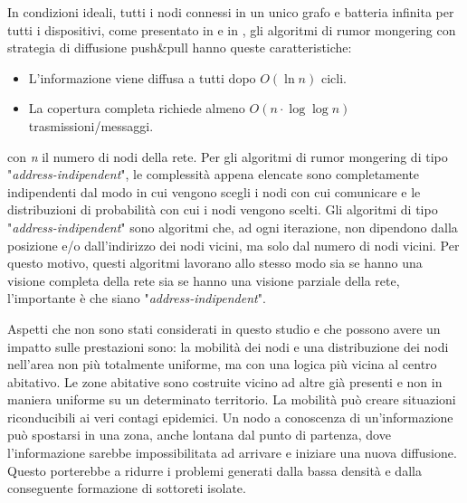 In condizioni ideali, tutti i nodi connessi in un unico grafo e batteria infinita per tutti i dispositivi, come presentato in \cite{gossip2000-comp} e in \cite{schindel2004-epidemicAlg}, gli algoritmi di rumor mongering con strategia di diffusione push\&pull hanno queste caratteristiche:
\begin{itemize}
	\item L'informazione viene diffusa a tutti dopo $ O\left( \ln \mathit{n} \right)  $ cicli.
	\item La copertura completa richiede almeno $ O\left( \mathit{n}\cdot\log \log \mathit{n} \right)  $ trasmissioni/messaggi.
\end{itemize}
con \textit{n} il numero di nodi della rete. Per gli algoritmi di rumor mongering di tipo "\textit{address-indipendent}", le complessità appena elencate sono completamente indipendenti dal modo in cui vengono scegli i nodi con cui comunicare e le distribuzioni di probabilità con cui i nodi vengono scelti. Gli algoritmi di tipo "\textit{address-indipendent}" sono algoritmi che, ad ogni iterazione, non dipendono dalla posizione e/o dall'indirizzo dei nodi vicini, ma solo dal numero di nodi vicini. Per questo motivo, questi algoritmi lavorano allo stesso modo sia se hanno una visione completa della rete sia se hanno una visione parziale della rete, l'importante è che siano "\textit{address-indipendent}".

Aspetti che non sono stati considerati in questo studio e che possono avere un impatto sulle prestazioni sono: la mobilità dei nodi e una distribuzione dei nodi nell'area non più totalmente uniforme, ma con una logica più vicina al centro abitativo. Le zone abitative sono costruite vicino ad altre già presenti e non in maniera uniforme su un determinato territorio. La mobilità può creare situazioni riconducibili ai veri contagi epidemici. Un nodo a conoscenza di un'informazione può spostarsi in una zona, anche lontana dal punto di partenza, dove l'informazione sarebbe impossibilitata ad arrivare e iniziare una nuova diffusione. Questo porterebbe a ridurre i problemi generati dalla bassa densità e dalla conseguente formazione di sottoreti isolate.